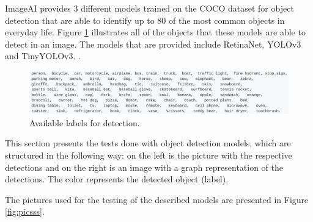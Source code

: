   ImageAI provides 3 different models trained on the COCO dataset for object detection that are able to identify up to 80 of the most common objects in everyday life. Figure \ref{fig:labels} illustrates all of the objects that these models are able to detect in an image. The models that are provided include RetinaNet, YOLOv3 and TinyYOLOv3. \cite{ImageAI}.
  

  

    \begin{figure}[H]
      \centering
      \includegraphics[width = \textwidth]{Sections/4InitialWork/4_images_random/detections.png}
      \caption{Available labels for detection. }
      \label{fig:labels} 
  \end{figure}

 This section presents the tests done with object detection models,  which are structured in the following way: on the left is the picture with the respective detections and on the right is an image with a graph representation of the detections. The color represents the detected object (label). 

  The pictures used for the testing of the described models are presented in Figure \ref{fig:picsss}.

